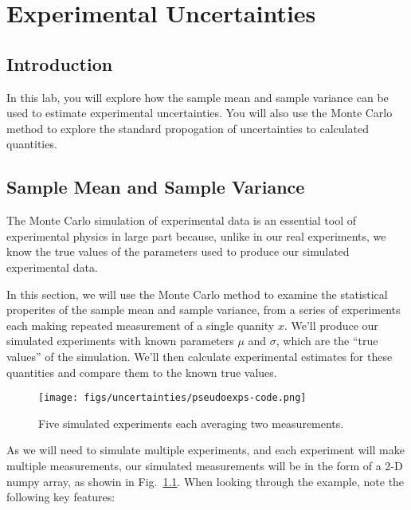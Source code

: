 \chapter{Experimental Uncertainties}


\section{Introduction}

In this lab, you will explore how the sample mean and sample variance
can be used to estimate experimental uncertainties.  You will also use
the Monte Carlo method to explore the standard propogation of
uncertainties to calculated quantities.

\section{Sample Mean and Sample Variance}

The Monte Carlo simulation of experimental data is an essential tool of
experimental physics in large part because, unlike in our real
experiments, we know the true values of the parameters used to produce
our simulated experimental data.

In this section, we will use the Monte Carlo method to examine the
statistical properites of the sample mean and sample variance, from a
series of experiments each making repeated measurement of a single
quanity $x$.  We'll produce our simulated experiments with known
parameters $\mu$ and $\sigma$, which are the ``true values'' of the
simulation.  We'll then calculate experimental estimates for these
quantities and compare them to the known true values.

\begin{figure}[htbp]
\begin{center}
\texttt{[image: figs/uncertainties/pseudoexps-code.png]}\\
\end{center}
\caption{\label{fig:pseudoexps} Five simulated experiments each averaging two measurements.}
\end{figure}

As we will need to simulate multiple experiments, and each experiment will
make multiple measurements, our simulated measurements will be in the
form of a 2-D numpy array, as showin in Fig.~\ref{fig:pseudoexps}.
When looking through the example, note the following key features:

